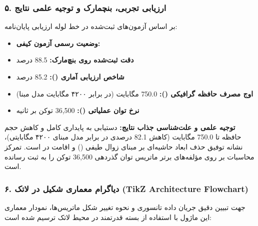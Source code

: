 \subsubsection*{۵. ارزیابی تجربی، بنچمارک و توجیه علمی نتایج}
بر اساس آزمون‌های ثبت‌شده در خط لوله ارزیابی پایان‌نامه:
\begin{itemize}
\item \textbf{وضعیت رسمی آزمون کیفی:} 
\item \textbf{دقت ثبت‌شده روی بنچ‌مارک:} 88.5 درصد
\item \textbf{شاخص ارزیابی آماری ():} 85.2 درصد
\item \textbf{اوج مصرف حافظه گرافیکی ():} 750.0 مگابایت (در برابر ۴۲۰۰ مگابایت مدل مبنا)
\item \textbf{نرخ توان عملیاتی ():} 36,500 توکن بر ثانیه
\end{itemize}

\textbf{توجیه علمی و علت‌شناسی جذاب نتایج:}
دستیابی به پایداری کامل و کاهش حجم حافظه تا 750.0 مگابایت (کاهش 82.1 درصدی در برابر مدل مبنای ۴۲۰۰ مگابایتی)، نشانه توفیق حذف ابعاد حاشیه‌ای بر مبنای زوال طیفی () و اقامت در  است. تمرکز محاسبات بر روی مؤلفه‌های برتر ماتریس توان گذردهی 36,500 توکن را به ثبت رسانده است.



\subsubsection*{۶. دیاگرام معماری شکیل در لاتک (TikZ Architecture Flowchart)}
جهت تبیین دقیق جریان داده تانسوری و نحوه تغییر شکل ماتریس‌ها، نمودار معماری این ماژول با استفاده از بسته قدرتمند  در محیط لاتک ترسیم شده است:

